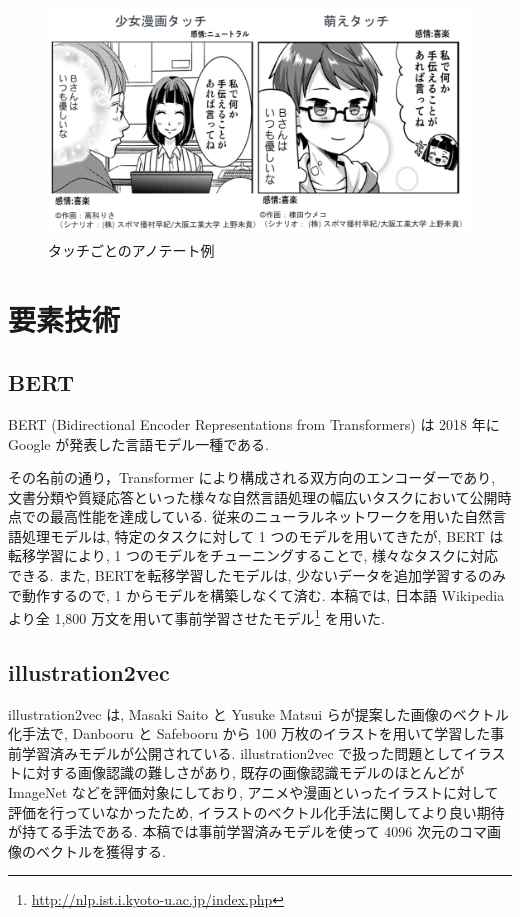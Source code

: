 \documentclass[twocolumn]{jarticle}     %
\begin{document}
\begin{figure}[t]
  \centering
  \includegraphics[width=\linewidth]{4koma.png}
  \caption{タッチごとのアノテート例}
  \label{fig:4koma}
\end{figure}

\section{要素技術}
\subsection{BERT}
BERT (Bidirectional Encoder Representations from Transformers)\cite{BERT} は 2018 年に Google が発表した言語モデル一種である.

その名前の通り，Transformer により構成される双方向のエンコーダーであり, 文書分類や質疑応答といった様々な自然言語処理の幅広いタスクにおいて公開時点での最高性能を達成している.
従来のニューラルネットワークを用いた自然言語処理モデルは, 特定のタスクに対して 1 つのモデルを用いてきたが, BERT は転移学習により, 1 つのモデルをチューニングすることで, 様々なタスクに対応できる. また, BERTを転移学習したモデルは, 少ないデータを追加学習するのみで動作するので, 1 からモデルを構築しなくて済む. 本稿では, 日本語 Wikipedia より全 1,800 万文を用いて事前学習させたモデル\footnote{\url{http://nlp.ist.i.kyoto-u.ac.jp/index.php}} を用いた.

\newpage

\subsection{illustration2vec}
illustration2vec\cite{i2v} は, Masaki Saito と Yusuke Matsui らが提案した画像のベクトル化手法で, Danbooru と Safebooru から 100 万枚のイラストを用いて学習した事前学習済みモデルが公開されている. illustration2vec で扱った問題としてイラストに対する画像認識の難しさがあり, 既存の画像認識モデルのほとんどが ImageNet などを評価対象にしており, アニメや漫画といったイラストに対して評価を行っていなかったため, イラストのベクトル化手法に関してより良い期待が持てる手法である. 本稿では事前学習済みモデルを使って 4096 次元のコマ画像のベクトルを獲得する.
\end{document}
